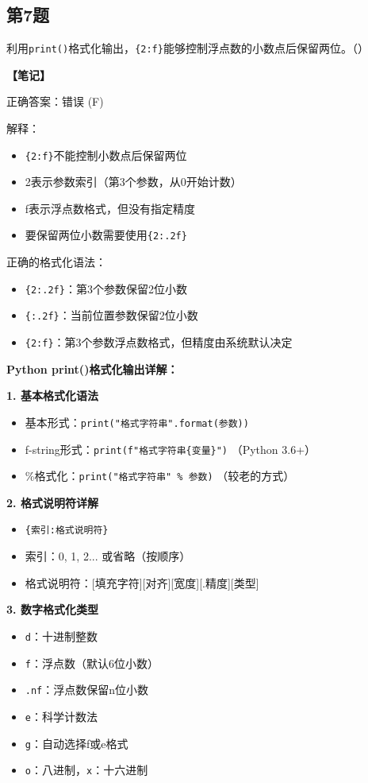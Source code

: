 \subsection{第7题}
利用\texttt{print()}格式化输出，\verb|{2:f}|能够控制浮点数的小数点后保留两位。（\quad）

\begin{mdframed}[linewidth=1pt, linecolor=black]
  \textbf{\color{red}【笔记】}

  正确答案：错误 (F)

  解释：
  \begin{itemize}
    \item \verb|{2:f}|不能控制小数点后保留两位
    \item 2表示参数索引（第3个参数，从0开始计数）
    \item f表示浮点数格式，但没有指定精度
    \item 要保留两位小数需要使用\verb|{2:.2f}|
  \end{itemize}

  正确的格式化语法：
  \begin{itemize}
    \item \verb|{2:.2f}|：第3个参数保留2位小数
    \item \verb|{:.2f}|：当前位置参数保留2位小数
    \item \verb|{2:f}|：第3个参数浮点数格式，但精度由系统默认决定
  \end{itemize}

  \label{string:format}
  \textbf{Python print()格式化输出详解：}

  \textbf{1. 基本格式化语法}
  \begin{itemize}
    \item 基本形式：\verb|print("格式字符串".format(参数))|
    \item f-string形式：\verb|print(f"格式字符串{变量}")| （Python 3.6+）
    \item \%格式化：\verb|print("格式字符串" % 参数)| （较老的方式）
    \end{itemize}

    \textbf{2. 格式说明符详解}
    \begin{itemize}
      \item \verb|{索引:格式说明符}|
      \item 索引：0, 1, 2... 或省略（按顺序）
      \item 格式说明符：[填充字符][对齐][宽度][.精度][类型]
    \end{itemize}

    \textbf{3. 数字格式化类型}
    \begin{itemize}
      \item \texttt{d}：十进制整数
      \item \texttt{f}：浮点数（默认6位小数）
      \item \texttt{.nf}：浮点数保留n位小数
      \item \texttt{e}：科学计数法
      \item \texttt{g}：自动选择f或e格式
      \item \texttt{o}：八进制，\texttt{x}：十六进制
    \end{itemize}


\end{mdframed}
